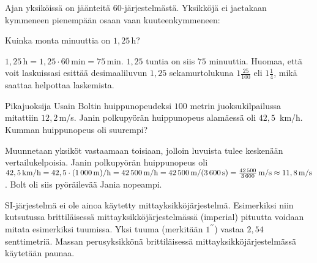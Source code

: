 Ajan yksiköissä on jäänteitä $60$-järjestelmästä. Yksikköjä ei jaetakaan kymmeneen pienempään osaan vaan kuuteenkymmeneen:


%
%
%
%

\begin{esimerkki}
Kuinka monta minuuttia on $1,25$\,h?

\begin{esimratk}
$1,25\,\text{h} = 1,25 \cdot 60\,\text{min} = 75\,\text{min}$. $1,25$ tuntia on siis $75$ minuuttia. Huomaa, että voit laskuissasi esittää desimaaliluvun $1,25$ sekamurtolukuna $1\frac{25}{100}$ eli $1\frac{1}{4}$, mikä saattaa helpottaa laskemista.
\end{esimratk}
\end{esimerkki}

\begin{esimerkki}
Pikajuoksija Usain Boltin huippunopeudeksi $100$ metrin juoksukilpailussa mitattiin $12,2$\,m/s. Janin polkupyörän huippunopeus alamäessä oli $42,5$\, km/h. Kumman huippunopeus oli suurempi?

\begin{esimratk}
Muunnetaan yksiköt vastaamaan toisiaan, jolloin luvuista tulee keskenään vertailukelpoisia. Janin polkupyörän huippunopeus oli $42,5\,\textrm{km/h} =42,5\cdot \textrm{(1\,000\,m)/h} = 42\,500\,\textrm{m/h} = 42\,500\,\textrm{m/(3\,600\,s)}= \frac{42\,500}{3\,600}\,\textrm{m/s} \approx 11,8\,\textrm{m/s}$. Bolt oli siis pyöräilevää Jania nopeampi.
\end{esimratk}
\end{esimerkki}


SI-järjestelmä ei ole ainoa käytetty mittayksikköjärjestelmä. Esimerkiksi niin kutsutussa brittiläisessä mittayksikköjärjestelmässä (imperial) pituutta voidaan mitata esimerkiksi tuumissa. Yksi tuuma (merkitään $1^{\prime \prime}$) vastaa $2,54$ senttimetriä. Massan perusyksikkönä brittiläisessä mittayksikköjärjestelmässä käytetään paunaa. %


